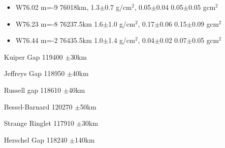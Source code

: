 \documentclass[crop=false,class=book]{standalone}
\begin{document}
\begin{enumerate}
\begin{itemize}
                    \item W76.02 m=-9 76018km,  1.3$\pm$0.7 g/$\textrm{cm}^2$, 0.05$\pm$0.04  0.05$\pm$0.05 g$\textrm{cm}^2$
                    \item W76.23 m=-8 76237.5km 1.6$\pm$1.0 g/$\textrm{cm}^2$, 0.17$\pm$0.06  0.15$\pm$0.09 g$\textrm{cm}^2$
                    \item W76.44 m=-2 76435.5km 1.0$\pm$1.4 g/$\textrm{cm}^2$, 0.04$\pm$0.02  0.07$\pm$0.05 g$\textrm{cm}^2$
                \end{itemize}
                \begin{itemize}
                    \begin{multicols}{2}
                        \item Kuiper Gap 119400 $\pm$30km
                        \item Jeffreys Gap 118950 $\pm$40km
                        \item Russell gap 118610 $\pm$40km
                        \item Bessel-Barnard 120270 $\pm$50km
                        \item Strange Ringlet 117910 $\pm$30km
                        \item Herschel Gap 118240 $\pm$140km
                    \end{multicols}
                \end{itemize}
            \end{enumerate}
\end{document}
